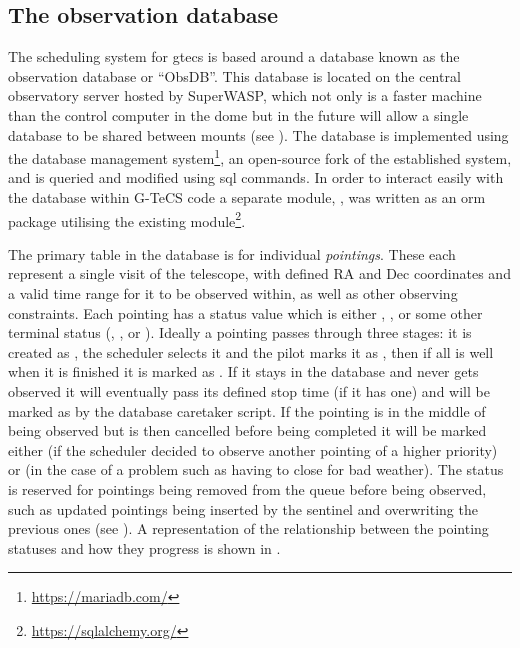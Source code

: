 \begin{colsection}
\begin{colsection}
\end{colsection}


\subsection{The observation database}
\label{sec:obsdb}
\begin{colsection}

The scheduling system for \gls{gtecs} is based around a database known as the observation database or ``ObsDB''. This database is located on the central observatory server hosted by SuperWASP, which not only is a faster machine than the control computer in the dome but in the future will allow a single database to be shared between mounts (see ). The database is implemented using the  database management system\footnote{\url{https://mariadb.com/}}, an open-source fork of the established  system, and is queried and modified using \gls{sql} commands. In order to interact easily with the database within G-TeCS code a separate  module, , was written as an \gls{orm} package utilising the existing  module\footnote{\url{https://sqlalchemy.org/}}.

The primary table in the database is for individual \textit{pointings}. These each represent a single visit of the telescope, with defined RA and Dec coordinates and a valid time range for it to be observed within, as well as other observing constraints. Each pointing has a status value which is either , ,  or some other terminal status (, ,  or ). Ideally a pointing passes through three stages: it is created as , the scheduler selects it and the pilot marks it as , then if all is well when it is finished it is marked as . If it stays in the database and never gets observed it will eventually pass its defined stop time (if it has one) and will be marked as  by the database caretaker script. If the pointing is in the middle of being observed but is then cancelled before being completed it will be marked either  (if the scheduler decided to observe another pointing of a higher priority) or  (in the case of a problem such as having to close for bad weather). The  status is reserved for pointings being removed from the queue before being observed, such as updated pointings being inserted by the sentinel and overwriting the previous ones (see ). A representation of the relationship between the pointing statuses and how they progress is shown in .


\end{colsection}
\end{colsection}
